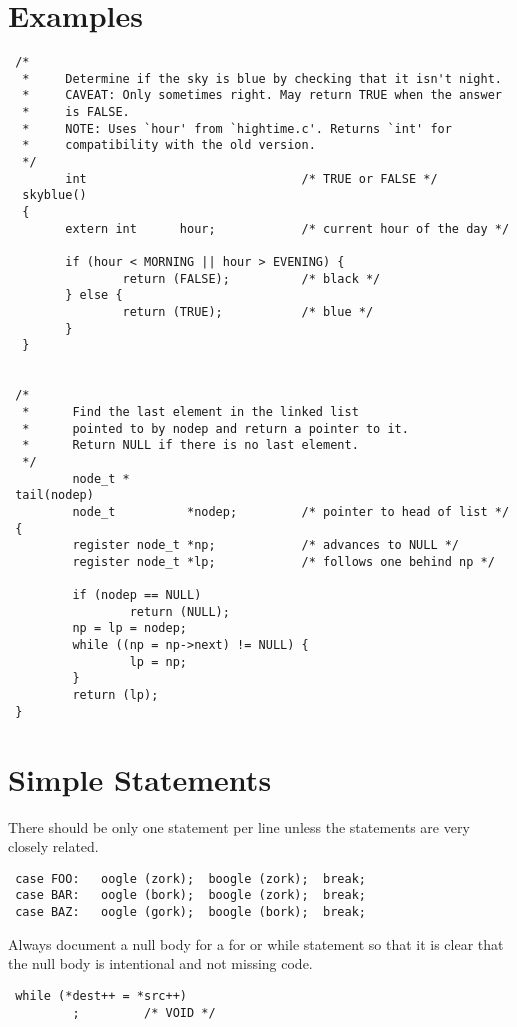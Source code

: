 \section*{Examples}
\begin{verbatim}
 /*
  *     Determine if the sky is blue by checking that it isn't night.
  *     CAVEAT: Only sometimes right. May return TRUE when the answer
  *     is FALSE.
  *     NOTE: Uses `hour' from `hightime.c'. Returns `int' for
  *     compatibility with the old version.
  */
        int                              /* TRUE or FALSE */
  skyblue()
  {
        extern int      hour;            /* current hour of the day */ 

        if (hour < MORNING || hour > EVENING) {
                return (FALSE);          /* black */
        } else {
                return (TRUE);           /* blue */
        }
  }


 /*
  *      Find the last element in the linked list
  *      pointed to by nodep and return a pointer to it.
  *      Return NULL if there is no last element.
  */
         node_t *
 tail(nodep)
         node_t          *nodep;         /* pointer to head of list */
 {
         register node_t *np;            /* advances to NULL */
         register node_t *lp;            /* follows one behind np */ 

         if (nodep == NULL)
                 return (NULL);
         np = lp = nodep;
         while ((np = np->next) != NULL) {
                 lp = np;
         }
         return (lp);
 }  
\end{verbatim}

\section{Simple Statements}
 There should be only one statement per line unless the statements are very
closely related. 
\begin{verbatim}
 case FOO:   oogle (zork);  boogle (zork);  break;
 case BAR:   oogle (bork);  boogle (zork);  break;
 case BAZ:   oogle (gork);  boogle (bork);  break;
\end{verbatim}

Always document a null body for a for or while statement so that it is clear
that the null body is intentional and not missing code. 
\begin{verbatim}
 while (*dest++ = *src++)
         ;         /* VOID */ 
\end{verbatim}

